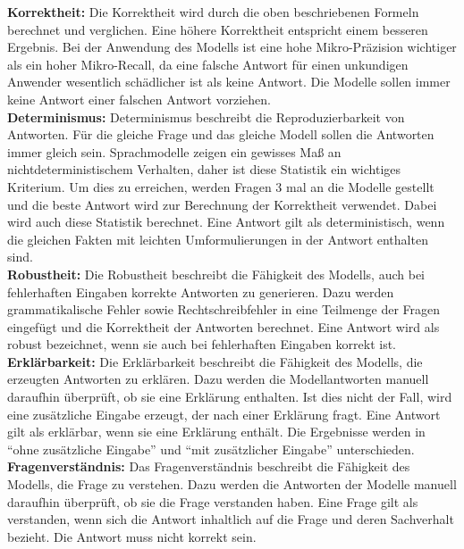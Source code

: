 \noindent\textbf{Korrektheit:}\newline
Die Korrektheit wird durch die oben beschriebenen Formeln berechnet und verglichen.
Eine höhere Korrektheit entspricht einem besseren Ergebnis.
Bei der Anwendung des Modells ist eine hohe Mikro-Präzision wichtiger als ein hoher Mikro-Recall, da eine falsche Antwort für einen unkundigen Anwender wesentlich schädlicher ist als keine Antwort.
Die Modelle sollen immer keine Antwort einer falschen Antwort vorziehen.\\

\noindent\textbf{Determinismus:}\newline
Determinismus beschreibt die Reproduzierbarkeit von Antworten.
Für die gleiche Frage und das gleiche Modell sollen die Antworten immer gleich sein.
Sprachmodelle zeigen ein gewisses Maß an nichtdeterministischem Verhalten, daher ist diese Statistik ein wichtiges Kriterium.
Um dies zu erreichen, werden Fragen 3 mal an die Modelle gestellt und die beste Antwort wird zur Berechnung der Korrektheit verwendet.
Dabei wird auch diese Statistik berechnet.
Eine Antwort gilt als deterministisch, wenn die gleichen Fakten mit leichten Umformulierungen in der Antwort enthalten sind.\\

\noindent\textbf{Robustheit:}\newline
Die Robustheit beschreibt die Fähigkeit des Modells, auch bei fehlerhaften Eingaben korrekte Antworten zu generieren.
Dazu werden grammatikalische Fehler sowie Rechtschreibfehler in eine Teilmenge der Fragen eingefügt und die Korrektheit der Antworten berechnet.
Eine Antwort wird als robust bezeichnet, wenn sie auch bei fehlerhaften Eingaben korrekt ist.\\

\noindent\textbf{Erklärbarkeit:}\newline
Die Erklärbarkeit beschreibt die Fähigkeit des Modells, die erzeugten Antworten zu erklären.
Dazu werden die Modellantworten manuell daraufhin überprüft, ob sie eine Erklärung enthalten.
Ist dies nicht der Fall, wird eine zusätzliche Eingabe erzeugt, der nach einer Erklärung fragt.
Eine Antwort gilt als erklärbar, wenn sie eine Erklärung enthält.
Die Ergebnisse werden in \enquote{ohne zusätzliche Eingabe} und \enquote{mit zusätzlicher Eingabe} unterschieden.\\

\noindent\textbf{Fragenverständnis:}\newline
Das Fragenverständnis beschreibt die Fähigkeit des Modells, die Frage zu verstehen.
Dazu werden die Antworten der Modelle manuell daraufhin überprüft, ob sie die Frage verstanden haben. Eine Frage gilt als verstanden, wenn sich die Antwort inhaltlich auf die Frage und deren Sachverhalt bezieht. Die Antwort muss nicht korrekt sein.
